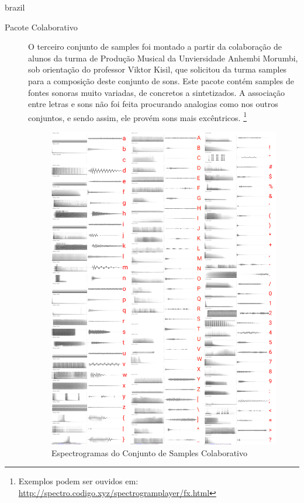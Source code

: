 \begin{otherlanguage*}{brazil}
\begin{description}
\item[Pacote Colaborativo]O terceiro conjunto de samples foi montado a partir da colaboração de alunos da turma de Produção Musical da Unviersidade Anhembi Morumbi, sob orientação do professor Viktor Kisil, que solicitou da turma samples para a composição deste conjunto de sons. Este pacote contém samples de fontes sonoras muito variadas, de concretos a sintetizados. A associação entre letras e sons não foi feita procurando analogias como nos outros conjuntos, e sendo assim, ele provém sons mais excêntricos. \footnote{Exemplos podem ser ouvidos em: \url{http://spectro.codigo.xyz/spectrogramplayer/fx.html}} 

\begin{figure}[htb]
    \caption{\label{samplescolab}Espectrogramas do Conjunto de Samples Colaborativo}
    \begin{center}
        \includegraphics[width=0.7\linewidth]{pictures/cap3/bandaabertacolab.jpg}
    \end{center}
\end{figure}


\end{description}
\end{otherlanguage*}
